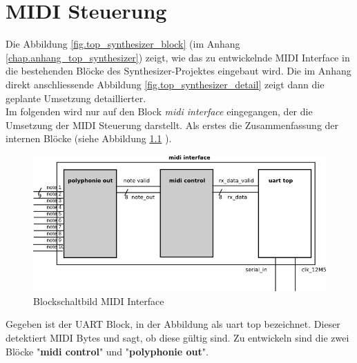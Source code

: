 
\chapter{MIDI Steuerung}\label{chap.midi}
Die Abbildung \ref{fig.top_synthesizer_block} (im Anhang \ref{chap.anhang_top_synthesizer}) zeigt, wie das zu entwickelnde MIDI Interface in die bestehenden Blöcke des Synthesizer-Projektes eingebaut wird. Die im Anhang direkt anschliessende Abbildung \ref{fig.top_synthesizer_detail} zeigt dann die geplante Umsetzung detaillierter.\\
\newline
Im folgenden wird nur auf den Block \textit{midi interface} eingegangen, der die Umsetzung der MIDI Steuerung darstellt. Als erstes die Zusammenfassung der internen Blöcke (siehe Abbildung \ref{fig.midi_interface_block} ).\\
\begin{figure}[H]
	\centering
	\includegraphics[width=1\textwidth]{images/midi_interface/midi_interface_block.png}
	\caption{Blockschaltbild MIDI Interface}
	\label{fig.midi_interface_block}
\end{figure}

Gegeben ist der UART Block, in der Abbildung als uart top bezeichnet. Dieser detektiert MIDI Bytes und sagt, ob diese gültig sind. Zu entwickeln sind die zwei Blöcke "\textbf{midi control}" und "\textbf{polyphonie out}".\\


